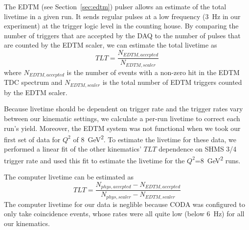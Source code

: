 The EDTM (see Section~\ref{sec:edtm}) pulser allows an estimate of the total
livetime in a given run.
It sends regular pulses at a low frequency (\SI{3}{\hertz} in our experiment) at the
trigger logic level in the counting house.
By comparing the number of triggers that are accepted by the DAQ to the number
of pulses that are counted by the EDTM scaler, we can estimate the total
livetime as
\begin{equation}
    TLT = \frac{N_{EDTM,accepted}}{N_{EDTM,scaler}}
\end{equation}
where $N_{EDTM,accepted}$ is the number of events with a non-zero hit in the
EDTM TDC spectrum and $N_{EDTM,scaler}$ is the total number of EDTM triggers
counted by the EDTM scaler.


Because livetime should be dependent on trigger rate and the trigger rates
vary between our kinematic settings, we calculate a per-run livetime to
correct each run's yield.
Moreover, the EDTM system was not functional when we took our first set of data
for $Q^2$ of \SI{8}{\giga\electronvolt\squared}.
To estimate the livetime for these data, we performed a linear fit of the other
kinematics' $TLT$ dependence on SHMS 3/4 trigger rate and used this fit to
estimate the livetime for the $Q^2$=\SI{8}{\giga\electronvolt\squared} runs.


The computer livetime can be estimated as
\begin{equation}
    TLT = \frac{N_{phys,accepted}-N_{EDTM,accepted}}{N_{phys,scaler}-N_{EDTM,scaler}}
\end{equation}
The computer livetime for our data is neglible because CODA was configured to
only take coincidence events, whose rates were all quite low (below
\SI{6}{\hertz}) for all our kinematics.



